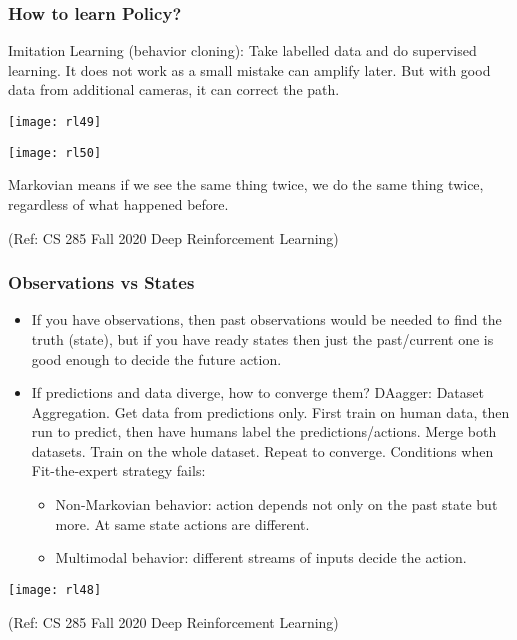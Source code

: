 \begin{frame}[fragile]\frametitle{How to learn Policy?}

Imitation Learning (behavior cloning): Take labelled data and do supervised learning. It does not work as a small mistake can amplify later. But with good data from additional cameras, it can correct the path.


\begin{center}
\texttt{[image: rl49]}

\texttt{[image: rl50]}

\end{center}

Markovian means if we see the same thing twice, we do the same thing twice, regardless of what happened before.


{\tiny (Ref: CS 285 Fall 2020 Deep Reinforcement Learning)}

\end{frame}


\begin{frame}[fragile]\frametitle{Observations vs States}

\begin{itemize}
\item If you have observations, then past observations would be needed to find the truth (state), but if you have ready states then just the past/current one is good enough to decide the future action.
\item If predictions and data diverge, how to converge them? DAagger: Dataset Aggregation. Get data from predictions only. First train on human data, then run to predict, then have humans label the predictions/actions. Merge both datasets. Train on the whole dataset. Repeat to converge.
Conditions when Fit-the-expert strategy fails:
\begin{itemize}
\item Non-Markovian behavior: action depends not only on the past state but more. At same state actions are different.
\item 	Multimodal behavior: different streams of inputs decide the action.
\end{itemize}

\end{itemize}


\begin{center}
\texttt{[image: rl48]}
\end{center}


{\tiny (Ref: CS 285 Fall 2020 Deep Reinforcement Learning)}

\end{frame}